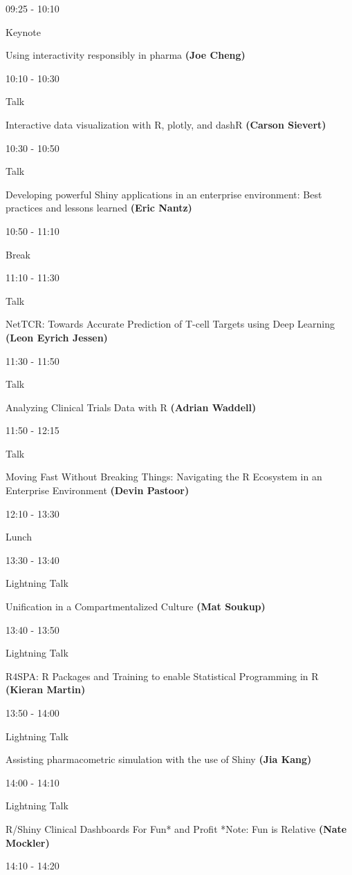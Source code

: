 \documentclass[]{book}
\theoremstyle{definition}
\theoremstyle{definition}
\theoremstyle{definition}
\theoremstyle{remark}
\begin{document}
09:25 - 10:10

Keynote

Using interactivity responsibly in pharma \textbf{(Joe Cheng)}

10:10 - 10:30

Talk

Interactive data visualization with R, plotly, and dashR \textbf{(Carson
Sievert)}

10:30 - 10:50

Talk

Developing powerful Shiny applications in an enterprise environment:
Best practices and lessons learned \textbf{(Eric Nantz)}

10:50 - 11:10

Break

11:10 - 11:30

Talk

NetTCR: Towards Accurate Prediction of T-cell Targets using Deep
Learning \textbf{(Leon Eyrich Jessen)}

11:30 - 11:50

Talk

Analyzing Clinical Trials Data with R \textbf{(Adrian Waddell)}

11:50 - 12:15

Talk

Moving Fast Without Breaking Things: Navigating the R Ecosystem in an
Enterprise Environment \textbf{(Devin Pastoor)}

12:10 - 13:30

Lunch

13:30 - 13:40

Lightning Talk

Unification in a Compartmentalized Culture \textbf{(Mat Soukup)}

13:40 - 13:50

Lightning Talk

R4SPA: R Packages and Training to enable Statistical Programming in R
\textbf{(Kieran Martin)}

13:50 - 14:00

Lightning Talk

Assisting pharmacometric simulation with the use of Shiny \textbf{(Jia
Kang)}

14:00 - 14:10

Lightning Talk

R/Shiny Clinical Dashboards For Fun* and Profit *Note: Fun is Relative
\textbf{(Nate Mockler)}

14:10 - 14:20
\end{document}
